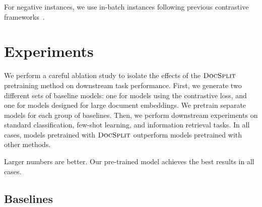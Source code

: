 \documentclass[11pt]{article}
\newcommand{\our}{\mbox{\textsc{DocSplit}}}
\begin{document}
For negative instances, we use in-batch instances following previous contrastive frameworks~\cite{Gao2021SimCSESC, Li2022UCTopicUC}.



\section{Experiments}

\label{sec:experiments}

We perform a careful ablation study to isolate the effects of the $\our$ pretraining method on downstream task performance.
First, we generate two different sets of baseline models: one for models using the contrastive loss, and one for models designed for large document embeddings.
We pretrain separate models for each group of baselines.
Then, we perform downstream experiments on standard classification, few-shot learning, and information retrieval tasks.
In all cases, models pretrained with $\our$ outperform models pretrained with other methods.


%
%
%
\begin{table}
    \centering
    
    \caption{Larger numbers are better. Our pre-trained model achieves the best results in all cases.}
    \vspace{-3mm}
    \label{results}
\end{table}

\subsection{Baselines}
\end{document}
